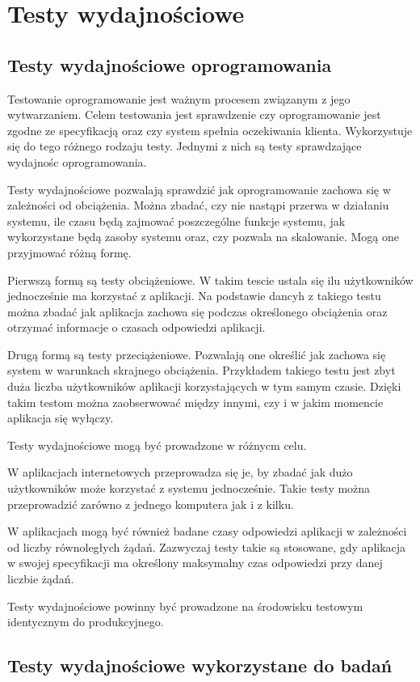 \chapter{Testy wydajnościowe}
\section{Testy wydajnościowe oprogramowania}
 Testowanie oprogramowanie jest ważnym procesem związanym z jego wytwarzaniem.  Celem testowania jest sprawdzenie czy oprogramowanie jest zgodne ze specyfikacją oraz czy system spełnia oczekiwania klienta. Wykorzystuje się do tego różnego rodzaju testy. Jednymi z nich są testy  sprawdzające wydajnośc oprogramowania. 

Testy wydajnościowe pozwalają sprawdzić jak oprogramowanie zachowa się w zależności od obciążenia. Można zbadać, czy nie nastąpi przerwa w działaniu systemu, ile czasu będą zajmować poszczególne funkcje systemu, jak wykorzystane będą zasoby systemu oraz, czy pozwala na skalowanie. Mogą one przyjmować różną formę. 

Pierwszą formą są testy obciążeniowe. W takim tescie ustala się ilu użytkowników jednocześnie ma korzystać z aplikacji. Na podstawie dancyh z takiego testu można zbadać jak aplikacja zachowa się podczas określonego obciążenia oraz otrzymać informacje o czasach odpowiedzi aplikacji.

Drugą formą są testy przeciążeniowe. Pozwalają one określić jak zachowa się system w warunkach skrajnego obciążenia. Przykładem takiego testu jest zbyt duża liczba użytkowników aplikacji korzystających w tym samym czasie. Dzięki takim testom można zaobserwować między innymi, czy i w jakim momencie aplikacja się wyłączy.

Testy wydajnościowe mogą być prowadzone w różnycm celu.

W aplikacjach internetowych  przeprowadza się je, by zbadać jak dużo użytkowników może korzystać z systemu jednocześnie. Takie testy można przeprowadzić zarówno z jednego komputera jak i z kilku. 

W aplikacjach mogą być również badane czasy odpowiedzi aplikacji w zależności od liczby równoległych żądań. Zazwyczaj testy takie są stosowane, gdy aplikacja w swojej specyfikacji ma określony maksymalny czas odpowiedzi przy danej liczbie żądań.

Testy wydajnościowe powinny być prowadzone na środowisku testowym identycznym do produkcyjnego.

\section{Testy wydajnościowe wykorzystane do badań}

